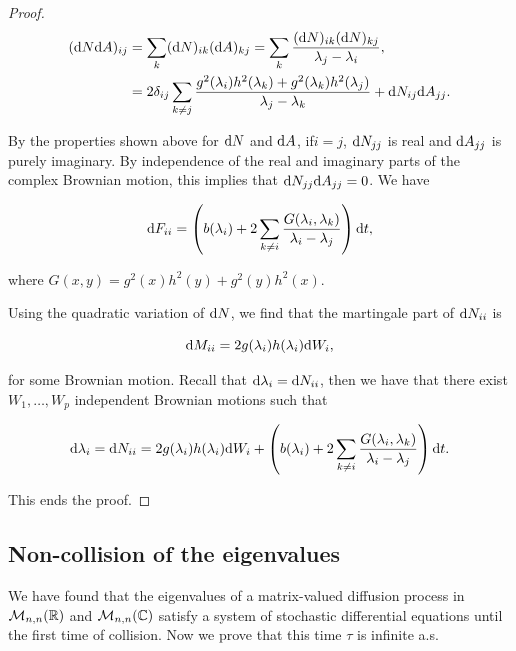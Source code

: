 \begin{proof}
    \begin{align*}
        (\mathrm d N\mathrm d A)_{ij} &= \sum_{k} (\mathrm d N)_{ik}(\mathrm d A)_{kj} = \sum_k \frac{(\mathrm d N)_{ik}(\mathrm d N)_{kj}}{\lambda_j - \lambda_i}, \\
        &= 2\delta_{ij}\sum_{k\neq j} \frac{ g^2(\lambda_i)h^2(\lambda_k) + g^2(\lambda_k)h^2(\lambda_j)}{\lambda_j - \lambda_k} + \mathrm d N_{ij}\mathrm d A_{jj}.
    \end{align*}

    By the properties shown above for $\mathrm d N$ and $\mathrm d A$, if$i=j$, $\mathrm d N_{jj}$ is real and $\mathrm d A_{jj}$ is purely imaginary. By independence of the real and imaginary parts of the complex Brownian motion, this implies that $\mathrm d N_{jj}\mathrm d A_{jj}=0$. We have

    \begin{equation*}
        \mathrm d F_{ii} = \left(b(\lambda_i) + 2 \sum_{k\neq i} \frac{G(\lambda_i,\lambda_k)}{\lambda_i - \lambda_j}\right)\mathrm d t,
    \end{equation*}

    \noindent where $G(x,y)=g^2(x)h^2(y) + g^2(y)h^2(x)$.

    Using the quadratic variation of $\mathrm d N$, we find that the martingale part of $\mathrm d N_{ii}$ is 

    \begin{equation*}
        \mathrm d M_{ii} = 2g(\lambda_i)h(\lambda_i)\mathrm d W_i,
    \end{equation*}

    \noindent for some Brownian motion. Recall that $\mathrm d \lambda_i = \mathrm d N_{ii}$, then we have that there exist $W_1,\dots,W_p$ independent Brownian motions such that

    \begin{equation*}
        \mathrm d \lambda_i = \mathrm d N_{ii} = 2g(\lambda_i)h(\lambda_i)\mathrm d W_i + \left(b(\lambda_i) + 2 \sum_{k\neq i} \frac{G(\lambda_i,\lambda_k)}{\lambda_i - \lambda_j}\right)\mathrm d t.
    \end{equation*}

    This ends the proof.
\end{proof}

\subsection{Non-collision of the eigenvalues}

We have found that the eigenvalues of a matrix-valued diffusion process in $\mathcal M_{n,n}(\mathbb R)$ and $\mathcal M_{n,n}(\mathbb C)$ satisfy a system of stochastic differential equations until the first time of collision. Now we prove that this time $\tau$ is infinite a.s. 

